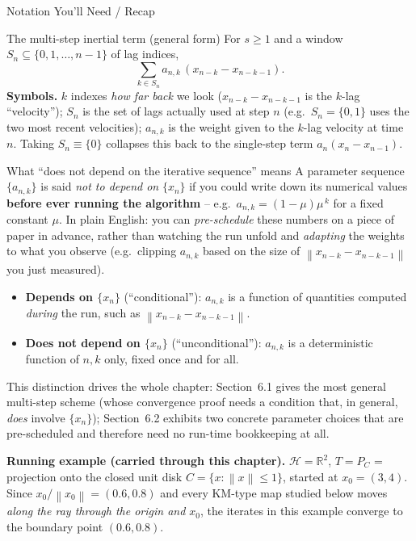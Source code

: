\documentclass[aspectratio=169,10pt]{beamer}
\newcommand{\R}{\mathbb{R}}
\newcommand{\Hil}{\mathcal{H}}
\newcommand{\norm}[1]{\left\|#1\right\|}
\begin{document}
\begin{frame}[allowframebreaks]{Notation You'll Need / Recap}
\begin{block}{The multi-step inertial term (general form)}
For $s\ge 1$ and a window $S_n\subseteq\{0,1,\dots,n-1\}$ of lag indices,
\[
\sum_{k\in S_n} a_{n,k}\,(x_{n-k}-x_{n-k-1}).
\]
\textbf{Symbols.} $k$ indexes \emph{how far back} we look ($x_{n-k}-x_{n-k-1}$
is the $k$-lag ``velocity''); $S_n$ is the set of lags actually used at step
$n$ (e.g.\ $S_n=\{0,1\}$ uses the two most recent velocities); $a_{n,k}$ is
the weight given to the $k$-lag velocity at time $n$. Taking $S_n\equiv\{0\}$
collapses this back to the single-step term $a_n(x_n-x_{n-1})$.
\end{block}

\framebreak

\begin{block}{What ``does not depend on the iterative sequence'' means}
A parameter sequence $\{a_{n,k}\}$ is said \emph{not to depend on}
$\{x_n\}$ if you could write down its numerical values \textbf{before ever
running the algorithm} -- e.g.\ $a_{n,k}=(1-\mu)\mu^{\,k}$ for a fixed
constant $\mu$. In plain English: you can \emph{pre-schedule} these numbers
on a piece of paper in advance, rather than watching the run unfold and
\emph{adapting} the weights to what you observe (e.g.\ clipping $a_{n,k}$
based on the size of $\norm{x_{n-k}-x_{n-k-1}}$ you just measured).
\begin{itemize}
\item \textbf{Depends on $\{x_n\}$} (``conditional''): $a_{n,k}$ is a
function of quantities computed \emph{during} the run, such as
$\norm{x_{n-k}-x_{n-k-1}}$.
\item \textbf{Does not depend on $\{x_n\}$} (``unconditional''): $a_{n,k}$
is a deterministic function of $n,k$ only, fixed once and for all.
\end{itemize}
This distinction drives the whole chapter: Section~6.1 gives the most
general multi-step scheme (whose convergence proof needs a condition that,
in general, \emph{does} involve $\{x_n\}$); Section~6.2 exhibits two
concrete parameter choices that are pre-scheduled and therefore need no
run-time bookkeeping at all.
\end{block}

\textbf{Running example (carried through this chapter).} $\Hil=\R^2$,
$T=P_C$ = projection onto the closed unit disk $C=\{x:\norm{x}\le 1\}$,
started at $x_0=(3,4)$. Since $x_0/\norm{x_0}=(0.6,0.8)$ and every KM-type
map studied below moves \emph{along the ray through the origin and $x_0$},
the iterates in this example converge to the boundary point $(0.6,0.8)$.

\end{frame}
\end{document}
